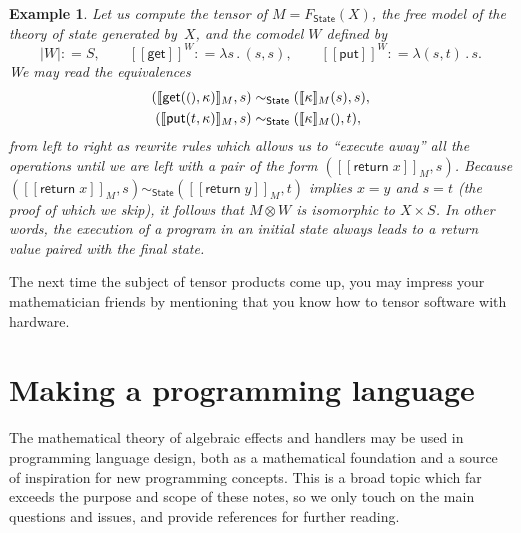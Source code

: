 \documentclass{amsart}
\newcommand{\theory}[1]{\mathsf{#1}} %
\newcommand{\Free}[2]{F_{\theory{#1}}(#2)} %
\newcommand{\lam}[1]{\lambda #1 \,.\,}
\newcommand{\unit}{{\text{\small$()$}}} %
\newcommand{\sem}[1]{[\![#1]\!]} %
\newcommand{\defeq}{\mathbin{{:}{=}}} %
\newcommand{\tensor}[2]{#1 \otimes #2} %
\newcommand{\kode}[1]{\mathsf{#1}}
\newcommand{\opcall}[3]{\kode{#1}(#2, #3)}
\newcommand{\return}[1]{\kode{return}\;#1}
\newtheorem{example}{Example}[section]
\begin{document}
\begin{example}
  Let us compute the tensor of $M = \Free{\theory{State}}{X}$, the free model of
  the theory of state generated by~$X$, and the comodel $W$ defined by
  \begin{equation*}
    |W| \defeq S,
    \qquad
    \sem{\kode{get}}^W \defeq \lam{s} (s, s),
    \qquad
    \sem{\kode{put}}^W \defeq \lam{(s,t)} s.
  \end{equation*}
  We may read the equivalences
  \begin{align*}
    (\sem{\opcall{get}{\unit}{\kappa}}_M, s) &\sim_{\theory{State}} (\sem{\kappa}_M (s), s), \\
    (\sem{\opcall{put}{t}{\kappa}}_M, s) &\sim_{\theory{State}} (\sem{\kappa}_M \unit, t),
  \end{align*}
  from left to right as rewrite rules which allows us to ``execute away'' all
  the operations until we are left with a pair of the form
  $(\sem{\return{x}}_M, s)$. Because
  $(\sem{\return{x}}_M, s) \sim_{\theory{State}} (\sem{\return{y}}_M, t)$
  implies $x = y$ and $s = t$ (the proof of which we skip), it follows that
  $\tensor{M}{W}$ is isomorphic to $X \times S$. In other words, the execution
  of a program in an initial state always leads to a return value paired with
  the final state.
\end{example}

The next time the subject of tensor products come up, you may impress your
mathematician friends by mentioning that you know how to tensor software with
hardware.


\section{Making a programming language}
\label{sec:making-progr-lang}


The mathematical theory of algebraic effects and handlers may be used in
programming language design, both as a mathematical foundation and a source of
inspiration for new programming concepts. This is a broad topic which far
exceeds the purpose and scope of these notes, so we only touch on the main
questions and issues, and provide references for further reading.
\end{document}
